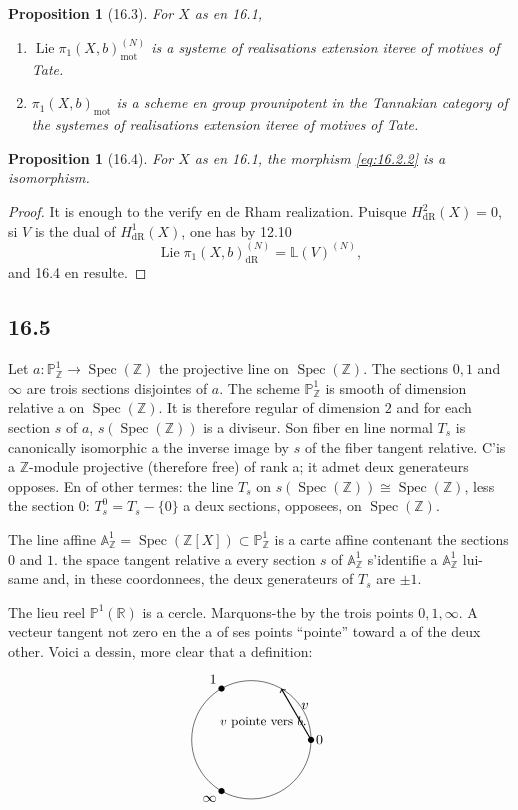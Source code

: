 \documentclass[12pt,a4paper]{article}
\theoremstyle{plain}
\newtheorem{proposition}[theorem]{Proposition}
\theoremstyle{definition}
\theoremstyle{remark}
\DeclareMathOperator{\Spec}{Spec}
\DeclareMathOperator{\Lie}{Lie}
\newcommand{\bZ}{\mathbb{Z}}
\newcommand{\bR}{\mathbb{R}}
\newcommand{\bP}{\mathbb{P}}
\newcommand{\bA}{\mathbb{A}}
\newcommand{\LL}{\mathbb{L}}
\newcommand{\dr}{\mathrm{dR}}
\newcommand{\mot}{\mathrm{mot}}
\begin{document}
\begin{proposition}[16.3]
For $X$ as en 16.1,
\begin{enumerate}[label=(\roman*), nosep]
\item $\Lie \pi_1(X, b)_{\mot}^{(N)}$ is a systeme of realisations extension iteree of motives of Tate.
\item $\pi_1(X, b)_{\mot}$ is a scheme en group prounipotent in the Tannakian category of the systemes of realisations extension iteree of motives of Tate.
\end{enumerate}
\end{proposition}

\begin{proposition}[16.4]
For $X$ as en 16.1, the morphism \eqref{eq:16.2.2} is a isomorphism.
\end{proposition}

\begin{proof}
It is enough to the verify en de Rham realization. Puisque $H_{\dr}^2(X) = 0$, si $V$ is the dual of $H_{\dr}^1(X)$, one has by 12.10
\[
\Lie \pi_1(X, b)_{\dr}^{(N)} = \LL(V)^{(N)},
\]
and 16.4 en resulte.
\end{proof}

\subsection*{16.5}

Let $a: \bP^1_{\bZ} \to \Spec(\bZ)$ the projective line on $\Spec(\bZ)$. The sections $0, 1$ and $\infty$ are trois sections disjointes of $a$. The scheme $\bP^1_{\bZ}$ is smooth of dimension relative a on $\Spec(\bZ)$. It is therefore regular of dimension $2$ and for each section $s$ of $a$, $s(\Spec(\bZ))$ is a diviseur. Son fiber en line normal $T_s$ is canonically isomorphic a the inverse image by $s$ of the fiber tangent relative. C'is a $\bZ$-module projective (therefore free) of rank a; it admet deux generateurs opposes. En of other termes: the line $T_s$ on $s(\Spec(\bZ)) \cong \Spec(\bZ)$, less the section $0$: $T_s^0 = T_s - \{0\}$ a deux sections, opposees, on $\Spec(\bZ)$.

The line affine $\bA^1_{\bZ} = \Spec(\bZ[X]) \subset \bP^1_{\bZ}$ is a carte affine contenant the sections $0$ and $1$. the space tangent relative a every section $s$ of $\bA^1_{\bZ}$ s'identifie a $\bA^1_{\bZ}$ lui-same and, in these coordonnees, the deux generateurs of $T_s$ are $\pm 1$.

The lieu reel $\bP^1(\bR)$ is a cercle. Marquons-the by the trois points $0, 1, \infty$. A vecteur tangent not zero en the a of ses points ``pointe'' toward a of the deux other. Voici a dessin, more clear that a definition:
\[
\begin{tikzpicture}[scale=1.5]
\draw (0,0) circle (1cm);
\fill (1,0) circle (1.5pt) node[right] {$0$};
\fill (-0.5,0.866) circle (1.5pt) node[above left] {$1$};
\fill (-0.5,-0.866) circle (1.5pt) node[below left] {$\infty$};
\draw[->,thick] (1,0) -- (0.5,0.866) node[midway,above right] {$v$};
\node at (0.2,0.3) {\small $v$ pointe vers $b$.};
\end{tikzpicture}
\]
\end{document}
